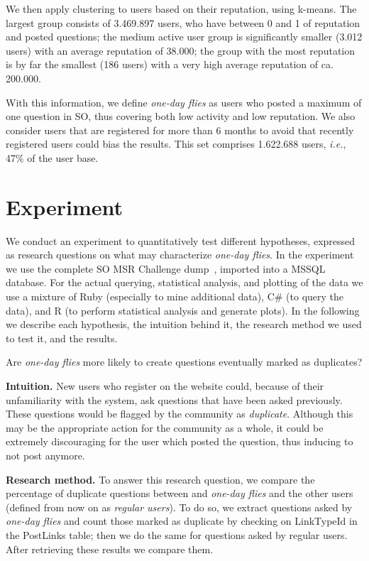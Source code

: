 \documentclass[conference]{IEEEtran}
\newcommand{\ie}{\emph{i.e.},\xspace}
\newcommand\odf{\emph{one-day flies}\xspace}
\newcommand\ru{regular users\xspace}
\begin{document}
We then apply clustering to users based on their reputation, using k-means.
The largest group consists of 3.469.897 users, who have between 0 and 1 of
reputation and posted questions; the medium active user group is significantly
smaller (3.012 users) with an average reputation of 38.000;  the group with the
most reputation is by far the smallest (186 users) with a very high average
reputation of ca. 200.000.

With this information, we define \odf as users who posted a maximum of one
question in SO, thus covering both low activity and low reputation. We also
consider users that are registered for more than 6 months to avoid that
recently registered users could bias the results. This set comprises 1.622.688
users, \ie 47\% of the user base. 



\section{Experiment}

We conduct an experiment to quantitatively test different hypotheses, expressed
as research questions on what may characterize \odf. In the experiment we use
the complete SO MSR Challenge dump~\cite{MSRChallenge2015}, imported into a
MSSQL database. For the actual querying, statistical analysis, and plotting of
the data we use a mixture of Ruby (especially to mine additional data), C\# (to
query the data), and R (to perform statistical analysis and generate plots).
In the following we describe each hypothesis, the intuition behind it, the
research method we used to test it, and the results.\\

\begin{tcolorbox}[size=fbox,title=RQ1: Duplicate Questions]
Are \odf more likely to create questions eventually marked as duplicates?
\end{tcolorbox}

\textbf{Intuition.} New users who register on
the website could, because of their unfamiliarity with the system, ask
questions that have been asked previously. These questions would be flagged
by the community as \textit{duplicate}. Although this may be the appropriate
action for the community as a whole, it could be extremely discouraging for the
user which posted the question, thus inducing to not post anymore. 

\textbf{Research method.} To answer this research question, we compare the
percentage of duplicate questions  between and \odf and the other users
(defined from now on as \emph{\ru}). To do so, we
extract questions asked by \odf and count those marked as duplicate by checking
on  LinkTypeId in the PostLinks table; then we do the same for questions asked
by \ru. After retrieving these results we compare them.
\end{document}
